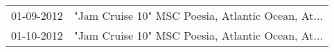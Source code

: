 \begin{supertabular}{ll}
 01-09-2012 &  "Jam Cruise 10" MSC Poesia, Atlantic Ocean, At... \\
 01-10-2012 &  "Jam Cruise 10" MSC Poesia, Atlantic Ocean, At... \\
\end{supertabular}
